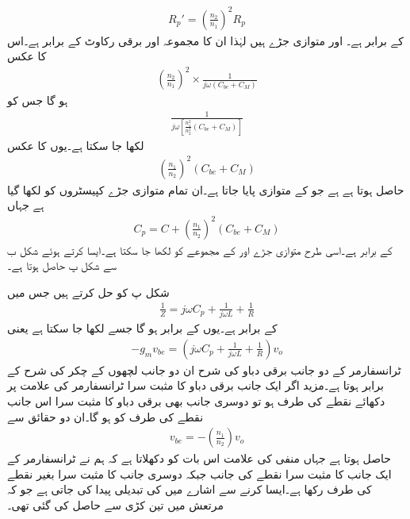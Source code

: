 \begin{align*}
R_p'=\left(\frac{n_2}{n_1} \right)^2 R_p
\end{align*}
کے برابر ہے۔ اور  متوازی جڑے ہیں لہٰذا ان کا مجموعہ  اور برقی رکاوٹ  کے برابر ہے۔اس کا عکس
\begin{align*}
\left(\frac{n_2}{n_1} \right)^2  \times \frac{1}{j \omega \left(C_{be}+C_M \right)}
\end{align*}
ہو گا جس کو
\begin{align*}
\frac{1}{j \omega \left[\frac{n_1^2}{n_2^2} \left(C_{be}+C_M \right)\right]}
\end{align*}
لکھا جا سکتا ہے۔یوں  کا عکس
 \begin{align*}
\left(\frac{n_1}{n_2} \right)^2 \left(C_{be}+C_M \right)
\end{align*}
حاصل ہوتا ہے ہے جو  کے متوازی پایا جاتا ہے۔ان تمام متوازی جڑے کپیسٹروں کو  لکھا گیا ہے جہاں
\begin{align*}
C_p = C +\left(\frac{n_1}{n_2} \right)^2 \left(C_{be}+C_M \right)
\end{align*}
کے برابر ہے۔اسی طرح متوازی جڑے  اور  کے مجموعے کو  لکھا جا سکتا ہے۔ایسا کرتے ہوئے شکل  ب سے شکل  پ حاصل ہوتا ہے۔


شکل  پ کو حل کرتے ہیں جس میں
\begin{align*}
\frac{1}{Z}=j \omega C_p +\frac{1}{j \omega L} +\frac{1}{R}
\end{align*}
کے برابر ہے۔یوں  کے برابر ہو گا جسے  لکھا جا سکتا ہے یعنی
\begin{align} \label{مساوات_ہمسر_الف}
-g_m v_{be}=\left(j \omega C_p +\frac{1}{j \omega L} +\frac{1}{R} \right) v_o
\end{align}
ٹرانسفارمر کے دو جانب برقی دباو کی شرح ان دو جانب لچھوں کے چکر کی شرح کے برابر ہوتا ہے۔مزید اگر ایک جانب برقی دباو کا مثبت سرا ٹرانسفارمر کی علامت پر دکھائے نقطے  کی طرف ہو تو دوسری جانب بھی برقی دباو کا مثبت سرا اس جانب نقطے  کی طرف کو ہو گا۔ان دو حقائق سے
\begin{align*}
v_{be}=-\left(\frac{n_1}{n_2} \right) v_o
\end{align*}
حاصل ہوتا ہے جہاں منفی کی علامت اس بات کو دکھلاتا ہے کہ ہم نے ٹرانسفارمر کے ایک جانب  کا مثبت سرا نقطے  کی جانب جبکہ دوسری جانب  کا مثبت سرا بغیر نقطے  کی طرف رکھا ہے۔ایسا کرنے سے اشارے میں  کی تبدیلی پیدا کی جاتی ہے جو کہ  مرتعش میں تین کڑی  سے حاصل کی گئی تھی۔

